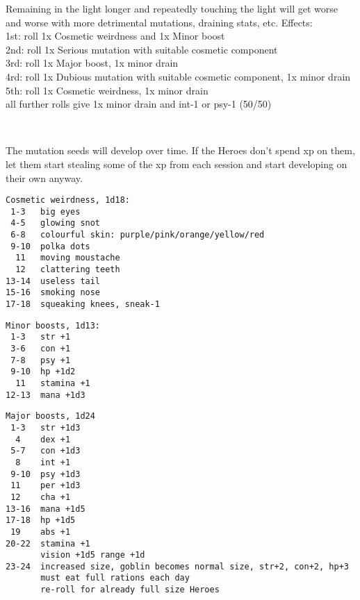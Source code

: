 Remaining in the light longer and repeatedly touching the light will get worse and worse with more detrimental mutations, draining stats, etc. Effects:\\
1st: roll 1x Cosmetic weirdness and 1x Minor boost\\
2nd: roll 1x Serious mutation with suitable cosmetic component\\
3rd: roll 1x Major boost, 1x minor drain\\
4rd: roll 1x Dubious mutation with suitable cosmetic component, 1x minor drain\\
5th: roll 1x Cosmetic weirdness, 1x minor drain\\
all further rolls give 1x minor drain and int-1 or psy-1 (50/50)

\

The mutation seeds will develop over time. If the Heroes don't spend xp on them, let them start stealing some of the xp from each session and start developing on their own anyway.


\raggedbottom

\goodbreak \small \begin{samepage} \begin{verbatim}
Cosmetic weirdness, 1d18:
 1-3   big eyes
 4-5   glowing snot
 6-8   colourful skin: purple/pink/orange/yellow/red
 9-10  polka dots
  11   moving moustache
  12   clattering teeth
13-14  useless tail
15-16  smoking nose
17-18  squeaking knees, sneak-1
\end{verbatim} \end{samepage} \normalsize

\goodbreak \small \begin{samepage} \begin{verbatim}
Minor boosts, 1d13:
 1-3   str +1
 3-6   con +1
 7-8   psy +1
 9-10  hp +1d2
  11   stamina +1
12-13  mana +1d3
\end{verbatim} \end{samepage} \normalsize

\goodbreak \small \begin{samepage} \begin{verbatim}
Major boosts, 1d24
 1-3   str +1d3
  4    dex +1
 5-7   con +1d3
  8    int +1
 9-10  psy +1d3
 11    per +1d3
 12    cha +1
13-16  mana +1d5
17-18  hp +1d5
 19    abs +1
20-22  stamina +1
       vision +1d5 range +1d
23-24  increased size, goblin becomes normal size, str+2, con+2, hp+3
       must eat full rations each day
       re-roll for already full size Heroes
\end{verbatim} \end{samepage} \normalsize

